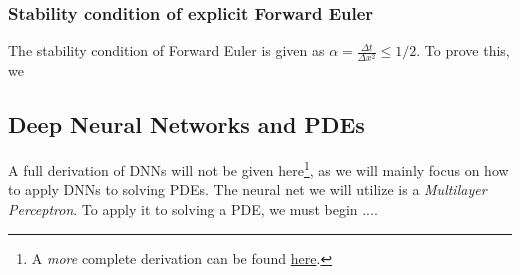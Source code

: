 \subsubsection{Stability condition of explicit Forward Euler}
The stability condition of Forward Euler is given as $\alpha = \frac{\Delta t}{\Delta x^2} \leq 1/2$. To prove this, we 

\subsection{Deep Neural Networks and PDEs}
A full derivation of DNNs will not be given here\footnote{A \textit{more} complete derivation can be found \href{https://github.com/hmvege/StatML/blob/master/doc/backpropagation.pdf}{here}.}, as we will mainly focus on how to apply DNNs to solving PDEs. The neural net we will utilize is a \textit{Multilayer Perceptron}. To apply it to solving a PDE, we must begin ....


